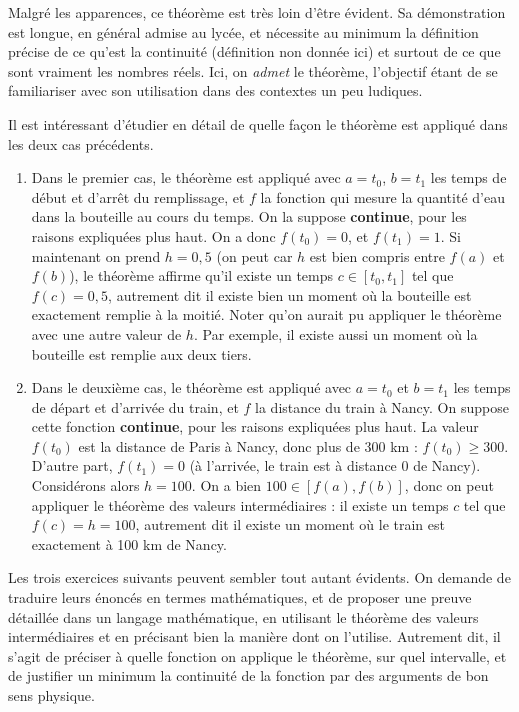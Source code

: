 Malgré les apparences, ce théorème est très loin d'être évident. Sa démonstration est longue, en général admise au lycée, et nécessite au minimum la définition précise de ce qu'est la continuité (définition non donnée ici) et surtout de ce que sont vraiment les nombres réels. Ici, on \emph{admet} le théorème, l'objectif étant de se familiariser avec son utilisation dans des contextes un peu ludiques.

Il est intéressant d'étudier en détail de quelle façon le théorème est appliqué dans les deux cas précédents.
\begin{enumerate}
\item Dans le premier cas, le théorème est appliqué avec $a=t_0$, $b=t_1$ les temps de début et d'arrêt du remplissage, et $f$ la fonction qui mesure la quantité d'eau dans la bouteille au cours du temps. On la suppose \textbf{continue}, pour les raisons expliquées plus haut. On a donc $f(t_0)=0$, et $f(t_1)=1$. Si maintenant on prend $h=0,5$ (on peut car $h$ est bien compris entre $f(a)$ et $f(b)$), le théorème affirme qu'il existe un temps $c\in[t_0,t_1]$ tel que $f(c)=0,5$, autrement dit il existe bien un moment où la bouteille est exactement remplie à la moitié. Noter qu'on aurait pu appliquer le théorème avec une autre valeur de $h$. Par exemple, il existe aussi un moment où la bouteille est remplie aux deux tiers.
\item Dans le deuxième cas, le théorème est appliqué avec $a=t_0$ et $b=t_1$ les temps de départ et d'arrivée du train, et $f$ la distance du train à Nancy. On  suppose cette fonction \textbf{continue}, pour les raisons expliquées plus haut. La valeur $f(t_0)$ est la distance de Paris à Nancy, donc plus de 300 km : $f(t_0)\geq 300$. D'autre part, $f(t_1) = 0$ (à l'arrivée, le train est à distance $0$ de Nancy). Considérons alors $h=100$. On a bien $100 \in [f(a),f(b)]$, donc on peut appliquer le théorème des valeurs intermédiaires : il existe un temps $c$ tel que $f(c)=h=100$, autrement dit il existe un moment où le train est exactement à 100 km de Nancy.
\end{enumerate}

\hrulefill

Les trois exercices suivants peuvent sembler tout autant évidents. On demande de traduire leurs énoncés en termes mathématiques, et de proposer une preuve détaillée dans un langage mathématique, en utilisant le théorème des valeurs intermédiaires et en précisant bien la manière dont on l'utilise. Autrement dit, il s'agit de préciser à quelle fonction on applique le théorème, sur quel intervalle, et de justifier un minimum la continuité de la fonction par des arguments de \og bon sens physique\fg.

